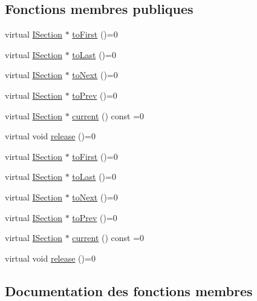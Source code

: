 \subsection*{Fonctions membres publiques}
\begin{DoxyCompactItemize}
\item 
virtual \hyperlink{class_i_section}{I\+Section} $\ast$ \hyperlink{class_i_section_iterator_ab003e6582ea200f83ceab4b4a74db01e}{to\+First} ()=0
\item 
virtual \hyperlink{class_i_section}{I\+Section} $\ast$ \hyperlink{class_i_section_iterator_ad1819cf5feb0ac2d16e61b3e0157dede}{to\+Last} ()=0
\item 
virtual \hyperlink{class_i_section}{I\+Section} $\ast$ \hyperlink{class_i_section_iterator_a23f01b7c0fc804209987c930df789ebc}{to\+Next} ()=0
\item 
virtual \hyperlink{class_i_section}{I\+Section} $\ast$ \hyperlink{class_i_section_iterator_af43d4541086f11c27a1a640573e17aa6}{to\+Prev} ()=0
\item 
virtual \hyperlink{class_i_section}{I\+Section} $\ast$ \hyperlink{class_i_section_iterator_abff3de0bc6f36fb26bcd34a9f4a46f43}{current} () const  =0
\item 
virtual void \hyperlink{class_i_section_iterator_a5a3cd47ee8110b6bd1379d2b8f7ccfef}{release} ()=0
\item 
virtual \hyperlink{class_i_section}{I\+Section} $\ast$ \hyperlink{class_i_section_iterator_ab003e6582ea200f83ceab4b4a74db01e}{to\+First} ()=0
\item 
virtual \hyperlink{class_i_section}{I\+Section} $\ast$ \hyperlink{class_i_section_iterator_ad1819cf5feb0ac2d16e61b3e0157dede}{to\+Last} ()=0
\item 
virtual \hyperlink{class_i_section}{I\+Section} $\ast$ \hyperlink{class_i_section_iterator_a23f01b7c0fc804209987c930df789ebc}{to\+Next} ()=0
\item 
virtual \hyperlink{class_i_section}{I\+Section} $\ast$ \hyperlink{class_i_section_iterator_af43d4541086f11c27a1a640573e17aa6}{to\+Prev} ()=0
\item 
virtual \hyperlink{class_i_section}{I\+Section} $\ast$ \hyperlink{class_i_section_iterator_abff3de0bc6f36fb26bcd34a9f4a46f43}{current} () const  =0
\item 
virtual void \hyperlink{class_i_section_iterator_a5a3cd47ee8110b6bd1379d2b8f7ccfef}{release} ()=0
\end{DoxyCompactItemize}


\subsection{Documentation des fonctions membres}
\hypertarget{class_i_section_iterator_abff3de0bc6f36fb26bcd34a9f4a46f43}{}
